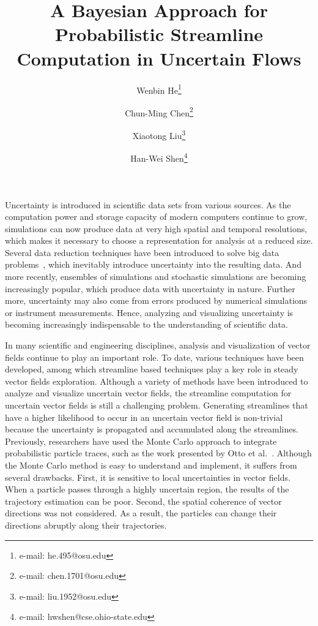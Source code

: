 \documentclass{vgtc}                          %
\title{A Bayesian Approach for Probabilistic Streamline Computation in Uncertain Flows}
\author{Wenbin He\thanks{e-mail: he.495@osu.edu} %
\and Chun-Ming Chen\thanks{e-mail: chen.1701@osu.edu} %
\and Xiaotong Liu\thanks{e-mail: liu.1952@osu.edu}
\and Han-Wei Shen\thanks{e-mail: hwshen@cse.ohio-state.edu}}
\affiliation{\scriptsize The Ohio State University}
\begin{document}


\maketitle

Uncertainty is introduced in scientific data sets from various sources. As the computation power and storage capacity of modern computers continue to grow, simulations can now produce data at very high spatial and temporal resolutions, which makes it necessary to choose a representation for analysis at a reduced size. Several data reduction techniques have been introduced to solve big data problems~\cite{6378985, 7156380, conf/ldav/LiuLBP12, DBLP:conf/ldav/ThompsonLBBGPP11}, which inevitably introduce uncertainty into the resulting data. And more recently, ensembles of simulations and stochastic simulations are becoming increasingly popular, which produce data with uncertainty in nature. Further more, uncertainty may also come from errors produced by numerical simulations or instrument measurements. Hence, analyzing and visualizing uncertainty is becoming increasingly indispensable to the understanding of scientific data.

In many scientific and engineering disciplines, analysis and visualization of vector fields continue to play an important role. To date, various techniques have been developed, among which streamline based techniques play a key role in steady vector fields exploration. Although a variety of methods have been introduced to analyze and visualize uncertain vector fields, the streamline computation for uncertain vector fields is still a challenging problem. Generating streamlines that have a higher likelihood to occur in an uncertain vector field is non-trivial because the uncertainty is propagated and accumulated along the streamlines. Previously, researchers have used the Monte Carlo approach to integrate probabilistic particle traces, such as the work presented by Otto et al.~\cite{Otto10a, Otto11a}. Although the Monte Carlo method is easy to understand and implement, it suffers from several drawbacks. First, it is sensitive to local uncertainties in vector fields. When a particle passes through a highly uncertain region, the results of the trajectory estimation can be poor. Second, the spatial coherence of vector directions was not considered. As a result, the particles can change their directions abruptly along their trajectories.
\end{document}
